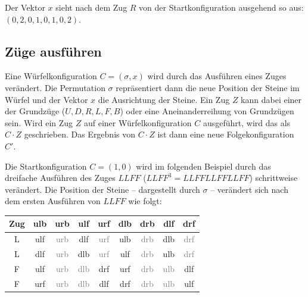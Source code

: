 \documentclass[12pt,a4paper, usenames, dvipsnames]{article}
\theoremstyle{mystyle}
\theoremstyle{definition}
\begin{document}
Der Vektor $x$ sieht nach dem Zug $R$ von der Startkonfiguration ausgehend so aus: $(0, 2, 0, 1, 0, 1, 0, 2)$. 

%
%
%
%
%
%
%
%
%
%
\subsection{Züge ausführen}

\label{Abschnitt_ZuegeAusfuehren}

Eine Würfelkonfiguration $C=(\sigma, x)$ wird durch das Ausführen eines Zuges verändert. Die Permutation $\sigma$ repräsentiert dann die neue Position der Steine im Würfel und der Vektor $x$ die Ausrichtung der Steine. Ein Zug $Z$ kann dabei einer der Grundzüge ($U,D,R,L,F,B$) oder eine Aneinanderreihung von Grundzügen sein. Wird ein Zug $Z$ auf einer Würfelkonfiguration $C$ ausgeführt, wird das als $C \cdot Z$ geschrieben. Das Ergebnis von $C \cdot Z$ ist dann eine neue Folgekonfiguration $C'$.

Die Startkonfiguration $C=(1,0)$ wird im folgenden Beispiel durch das dreifache Ausführen des Zuges $LLFF$ ($LLFF^3 = LLFFLLFFLLFF$) schrittweise verändert.
Die Position der Steine -- dargestellt durch $\sigma$ -- verändert sich nach dem ersten Ausführen von $LLFF$ wie folgt:

\begin{center}
\begin{tabular}{ccccccccc}
\toprule
\textbf{Zug} & \textbf{ulb} & \textbf{urb} & \textbf{ulf} & \textbf{urf} & \textbf{dlb} & \textbf{drb} & \textbf{dlf} & \textbf{drf} \\
\midrule

L & ulf & \textcolor{gray}{urb} & dlf & \textcolor{gray}{urf} & ulb & \textcolor{gray}{drb} & dlb & \textcolor{gray}{drf} \\

L & dlf & \textcolor{gray}{urb} & dlb & \textcolor{gray}{urf} & ulf & \textcolor{gray}{drb} & ulb & \textcolor{gray}{drf} \\

F & ulf & \textcolor{gray}{urb} & \textcolor{gray}{dlb} & drf & urf & \textcolor{gray}{drb} & \textcolor{gray}{ulb} & dlf \\

F & urf & \textcolor{gray}{urb} & \textcolor{gray}{dlb} & dlf & drf & \textcolor{gray}{drb} & \textcolor{gray}{ulb} & ulf \\
\bottomrule
\end{tabular}
\end{center}
\end{document}
